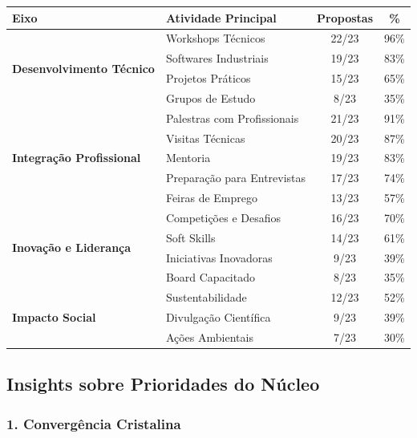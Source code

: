 \documentclass[12pt,a4paper]{article}
\begin{document}
\begin{center}
\small
\begin{tabularx}{\linewidth}{p{4.5cm} p{4.5cm} c c}
\arrayrulecolor{icebd}\toprule
\rowcolor{navy}\color{white}\bfseries Eixo & \color{white}\bfseries Atividade Principal & \color{white}\bfseries Propostas & \color{white}\bfseries \% \\
\midrule
\multirow{4}{*}{\color{steelblue}\bfseries Desenvolvimento Técnico} & Workshops Técnicos & 22/23 & 96\% \\
\rowcolor{rowalt} & Softwares Industriais & 19/23 & 83\% \\
 & Projetos Práticos & 15/23 & 65\% \\
\rowcolor{rowalt} & Grupos de Estudo & 8/23 & 35\% \\
\midrule
\multirow{5}{*}{\color{skyblue}\bfseries Integração Profissional} & Palestras com Profissionais & 21/23 & 91\% \\
\rowcolor{rowalt} & Visitas Técnicas & 20/23 & 87\% \\
 & Mentoria & 19/23 & 83\% \\
\rowcolor{rowalt} & Preparação para Entrevistas & 17/23 & 74\% \\
 & Feiras de Emprego & 13/23 & 57\% \\
\midrule
\multirow{4}{*}{\color{navy}\bfseries Inovação e Liderança} & Competições e Desafios & 16/23 & 70\% \\
\rowcolor{rowalt} & Soft Skills & 14/23 & 61\% \\
 & Iniciativas Inovadoras & 9/23 & 39\% \\
\rowcolor{rowalt} & Board Capacitado & 8/23 & 35\% \\
\midrule
\multirow{3}{*}{\color{alertred}\bfseries Impacto Social} & Sustentabilidade & 12/23 & 52\% \\
\rowcolor{rowalt} & Divulgação Científica & 9/23 & 39\% \\
 & Ações Ambientais & 7/23 & 30\% \\
\bottomrule
\end{tabularx}
\end{center}

\newpage

\subsection{Insights sobre Prioridades do Núcleo}

\subsubsection*{1. Convergência Cristalina}
\end{document}
